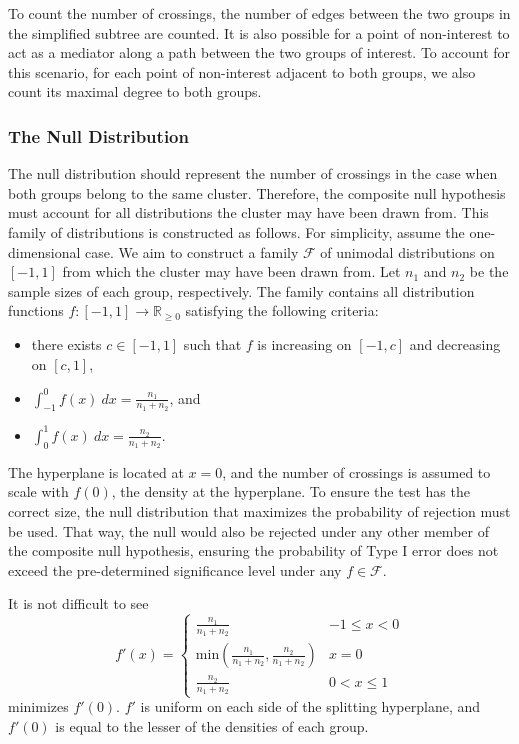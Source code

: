 \documentclass{article}
\begin{document}
{To count the number of crossings, the number of edges between the two groups in the simplified subtree are counted. It is also possible for a point of non-interest to act as a mediator along a path between the two groups of interest. To account for this scenario, for each point of non-interest adjacent to both groups, we also count its maximal degree to both groups.

\subsubsection{The Null Distribution}
The null distribution should represent the number of crossings in the case when both groups belong to the same cluster. Therefore, the composite null hypothesis must account for all distributions the cluster may have been drawn from. This family of distributions is constructed as follows. For simplicity, assume the one-dimensional case. We aim to construct a family $\mathcal{F}$ of unimodal distributions on $[-1,1]$ from which the cluster may have been drawn from. Let $n_1$ and $n_2$ be the sample sizes of each group, respectively. The family contains all distribution functions $f:[-1,1] \to \mathbb{R}_{\geq 0}$ satisfying the following criteria:
\begin{itemize}
	\item there exists $c \in [-1,1]$ such that $f$ is increasing on $[-1,c]$ and decreasing on $[c,1]$,
	\item $\int_{-1}^0 f(x) \:dx = \frac{n_1}{n_1+n_2}$, and
	\item $\int_0^1 f(x) \:dx = \frac{n_2}{n_1+n_2}$.
\end{itemize}
The hyperplane is located at $x = 0$, and the number of crossings is assumed to scale with $f(0)$, the density at the hyperplane. To ensure the test has the correct size, the null distribution that maximizes the probability of rejection must be used. That way, the null would also be rejected under any other member of the composite null hypothesis, ensuring the probability of Type I error does not exceed the pre-determined significance level under any $f \in \mathcal{F}$.

It is not difficult to see
$$f'(x) = \begin{cases}
\frac{n_1}{n_1+n_2} & -1 \leq x < 0\\
\textrm{min}(\frac{n_1}{n_1+n_2}, \frac{n_2}{n_1+n_2}) & x = 0\\
\frac{n_2}{n_1+n_2} & 0 < x \leq 1
\end{cases}$$
minimizes $f'(0)$. $f'$ is uniform on each side of the splitting hyperplane, and $f'(0)$ is equal to the lesser of the densities of each group.

}
\end{document}
